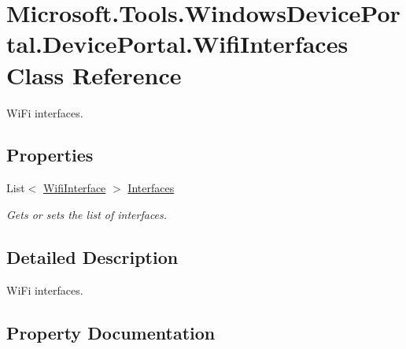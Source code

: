 \hypertarget{class_microsoft_1_1_tools_1_1_windows_device_portal_1_1_device_portal_1_1_wifi_interfaces}{}\section{Microsoft.\+Tools.\+Windows\+Device\+Portal.\+Device\+Portal.\+Wifi\+Interfaces Class Reference}
\label{class_microsoft_1_1_tools_1_1_windows_device_portal_1_1_device_portal_1_1_wifi_interfaces}


Wi\+Fi interfaces.  


\subsection*{Properties}
\begin{DoxyCompactItemize}
\item 
List$<$ \hyperlink{class_microsoft_1_1_tools_1_1_windows_device_portal_1_1_device_portal_1_1_wifi_interface}{Wifi\+Interface} $>$ \hyperlink{class_microsoft_1_1_tools_1_1_windows_device_portal_1_1_device_portal_1_1_wifi_interfaces_ab9147c6afb5909c97c0630ce750b21e0}{Interfaces}
\begin{DoxyCompactList}\small\item\em Gets or sets the list of interfaces. \end{DoxyCompactList}\end{DoxyCompactItemize}


\subsection{Detailed Description}
Wi\+Fi interfaces. 



\subsection{Property Documentation}
